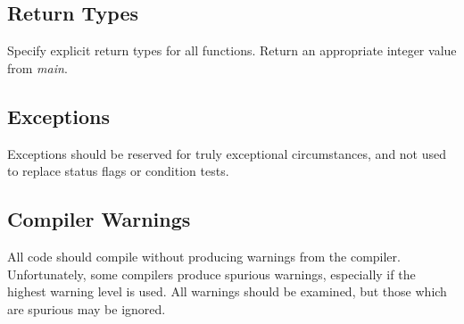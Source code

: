 \subsection {Return Types}
Specify explicit return types for all functions.  Return an appropriate
integer value from {\em main}.
\subsection {Exceptions}
Exceptions should be reserved for truly exceptional circumstances, and
not used to replace status flags or condition tests.
\subsection {Compiler Warnings}
All code should compile without producing warnings from the 
compiler.  Unfortunately, some compilers produce spurious warnings, especially
if the highest warning level is used.  All warnings should be 
examined, but those which are spurious may be ignored.

